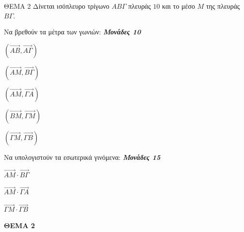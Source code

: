 \documentclass[11pt,a4paper,twoside]{book}
\newcommand{\OnPar}[1]{{\notoserif\bfseries\fontsize{18}{22}\selectfont #1}}
\newcommand{\monades}[1]{
\hspace*{\fill}
\textbf{\textit{\textcolor{maincolor}{Μονάδες #1}}}}
\begin{document}
ΘΕΜΑ 2
Δίνεται ισόπλευρο τρίγωνο $AB\Gamma$ πλευράς $10$ και το μέσο $M$ της πλευράς $B\Gamma$.

\begin{alist}    \item Να βρεθούν τα μέτρα των γωνιών: \monades{10}
    \begin{rlist}
        \item $\left(\vec{AB}, \vec{A\Gamma}\right)$
        \item $\left(\vec{AM}, \vec{B\Gamma}\right)$
        \item $\left(\vec{AM}, \vec{\Gamma A}\right)$
        \item $\left(\vec{BM}, \vec{\Gamma M}\right)$
        \item $\left(\vec{\Gamma M}, \vec{\Gamma B}\right)$
    \end{rlist}
    \item Να υπολογιστούν τα εσωτερικά γινόμενα: \monades{15}
    \begin{rlist}
        \item $\vec{AM} \cdot \vec{B\Gamma}$
        \item $\vec{AM} \cdot \vec{\Gamma A}$
        \item $\vec{\Gamma M} \cdot \vec{\Gamma B}$
    \end{rlist}\end{alist}

\begin{center}
\end{center}

\vspace{4mm}

\OnPar{ΘΕΜΑ 2}
\vspace{4mm} %
\end{document}
